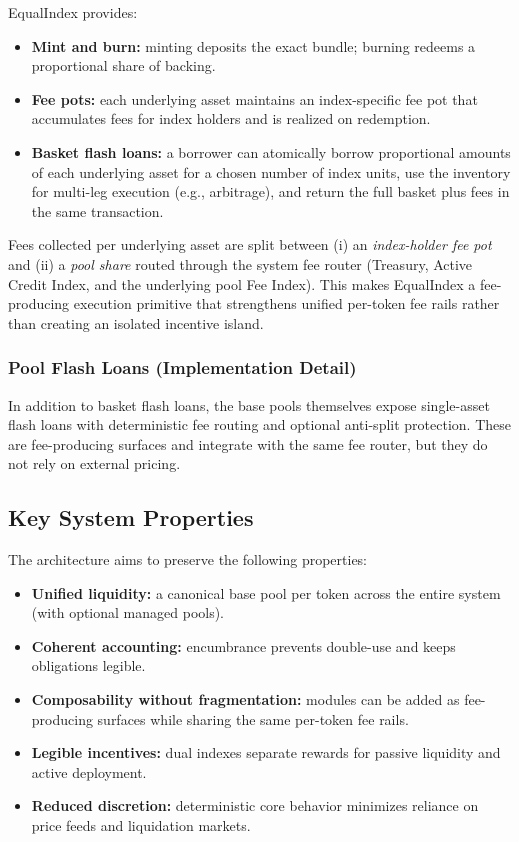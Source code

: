 \documentclass[version=preprint]{iacrcc}
\begin{document}
EqualIndex provides:
\begin{itemize}
  \item \textbf{Mint and burn:} minting deposits the exact bundle; burning redeems a proportional share of backing.
  \item \textbf{Fee pots:} each underlying asset maintains an index-specific fee pot that accumulates fees for index holders and is realized on redemption.
  \item \textbf{Basket flash loans:} a borrower can atomically borrow proportional amounts of each underlying asset for a chosen number of index units, use the inventory for multi-leg execution (e.g., arbitrage), and return the full basket plus fees in the same transaction.
\end{itemize}

Fees collected per underlying asset are split between (i) an \textit{index-holder fee pot} and (ii) a \textit{pool share} routed through the system fee router (Treasury, Active Credit Index, and the underlying pool Fee Index). This makes EqualIndex a fee-producing execution primitive that strengthens unified per-token fee rails rather than creating an isolated incentive island.

\subsubsection{Pool Flash Loans (Implementation Detail)}
In addition to basket flash loans, the base pools themselves expose single-asset flash loans with deterministic fee routing and optional anti-split protection. These are fee-producing surfaces and integrate with the same fee router, but they do not rely on external pricing.

\subsection{Key System Properties}

The architecture aims to preserve the following properties:
\begin{itemize}
  \item \textbf{Unified liquidity:} a canonical base pool per token across the entire system (with optional managed pools).
  \item \textbf{Coherent accounting:} encumbrance prevents double-use and keeps obligations legible.
  \item \textbf{Composability without fragmentation:} modules can be added as fee-producing surfaces while sharing the same per-token fee rails.
  \item \textbf{Legible incentives:} dual indexes separate rewards for passive liquidity and active deployment.
  \item \textbf{Reduced discretion:} deterministic core behavior minimizes reliance on price feeds and liquidation markets.
\end{itemize}
\end{document}
